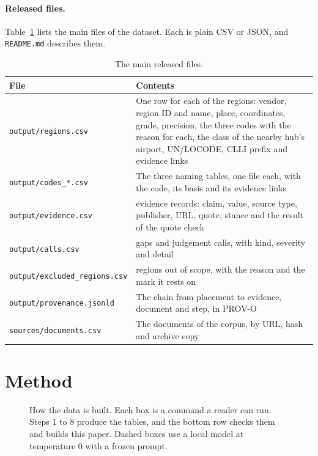 \documentclass[10pt,twocolumn]{article}
\newcommand{\code}[1]{\texttt{#1}}
\begin{document}
\paragraph{Released files.} Table~\ref{tab:files} lists the main files of the dataset. Each is plain CSV or JSON, and \code{README.md} describes them.

\begin{table}[t]
\centering
\small
\begin{tabular}{p{}p{}}
\toprule
File & Contents \\
\midrule
\code{output/\allowbreak regions.csv} & One row for each of the \regionCount{} regions: vendor, region ID and name, place, coordinates, grade, precision, the three codes with the reason for each, the class of the nearby hub's airport, UN/LOCODE, CLLI prefix and evidence links \\
\code{output/\allowbreak codes\_*.csv} & The three naming tables, one file each, with the code, its basis and its evidence links \\
\code{output/\allowbreak evidence.csv} & \evidenceCount{} evidence records: claim, value, source type, publisher, URL, quote, stance and the result of the quote check \\
\code{output/\allowbreak calls.csv} & \callCount{} gaps and judgement calls, with kind, severity and detail \\
\code{output/\allowbreak excluded\_regions.csv} & \excludedCount{} regions out of scope, with the reason and the mark it rests on \\
\code{output/\allowbreak provenance.jsonld} & The chain from placement to evidence, document and step, in PROV-O \\
\code{sources/\allowbreak documents.csv} & The \corpusDocuments{} documents of the corpus, by URL, hash and archive copy \\
\bottomrule
\end{tabular}
\caption{The main released files.}
\label{tab:files}
\end{table}

\section{Method}
\label{sec:method}

\begin{figure}[tp]
\centering

\caption{How the data is built. Each box is a command a reader can run. Steps 1 to 8 produce the tables, and the bottom row checks them and builds this paper. Dashed boxes use a local model at temperature 0 with a frozen prompt.}
\label{fig:pipeline}
\end{figure}
\end{document}
